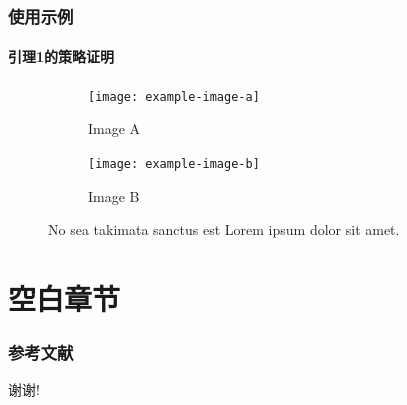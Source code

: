 \documentclass[UTF8,aspectratio=43,presentation]{ctexbeamer}
\begin{document}
\begin{frame}[t]
  \frametitle{使用示例}
  \framesubtitle{引理1的策略证明}

\begin{figure}
    \centering
    \begin{subfigure}{0.47\textwidth}
      \texttt{[image: example-image-a]}
      \caption{Image A}
      \label{fig:1-1}
  \end{subfigure}
  \begin{subfigure}{0.47\textwidth}
      \texttt{[image: example-image-b]}
      \caption{Image B}
      \label{fig:1-2}
  \end{subfigure}
    \caption{No sea takimata sanctus est Lorem ipsum dolor sit amet.  }%
    \label{fig:1}
  \end{figure}
  
\end{frame}

\section{空白章节}

\begin{frame}[t]
  \frametitle{参考文献}

\printbibliography[heading=none]
  
\end{frame}

\begin{frame}[c]

  谢谢!
  
\end{frame}
\end{document}
